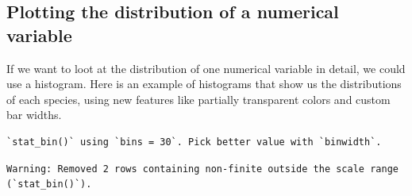 \documentclass[
  letterpaper,
  DIV=11,
  numbers=noendperiod]{scrreprt}
\newenvironment{Shaded}{\begin{snugshade}}{\end{snugshade}}
\newcommand{\AttributeTok}[1]{\textcolor[rgb]{0.40,0.45,0.13}{#1}}
\newcommand{\CommentTok}[1]{\textcolor[rgb]{0.37,0.37,0.37}{#1}}
\newcommand{\DecValTok}[1]{\textcolor[rgb]{0.68,0.00,0.00}{#1}}
\newcommand{\FloatTok}[1]{\textcolor[rgb]{0.68,0.00,0.00}{#1}}
\newcommand{\FunctionTok}[1]{\textcolor[rgb]{0.28,0.35,0.67}{#1}}
\newcommand{\NormalTok}[1]{\textcolor[rgb]{0.00,0.23,0.31}{#1}}
\newcommand{\SpecialCharTok}[1]{\textcolor[rgb]{0.37,0.37,0.37}{#1}}
\newcommand{\StringTok}[1]{\textcolor[rgb]{0.13,0.47,0.30}{#1}}
\begin{document}
\begin{tcolorbox}
\begin{Shaded}
\end{Shaded}

\end{tcolorbox}

\hypertarget{plotting-the-distribution-of-a-numerical-variable}{%
\subsection{Plotting the distribution of a numerical
variable}\label{plotting-the-distribution-of-a-numerical-variable}}

If we want to loot at the distribution of one numerical variable in
detail, we could use a histogram. Here is an example of histograms that
show us the distributions of each species, using new features like
partially transparent colors and custom bar widths.

\begin{verbatim}
`stat_bin()` using `bins = 30`. Pick better value with `binwidth`.
\end{verbatim}

\begin{verbatim}
Warning: Removed 2 rows containing non-finite outside the scale range
(`stat_bin()`).
\end{verbatim}
\end{document}
